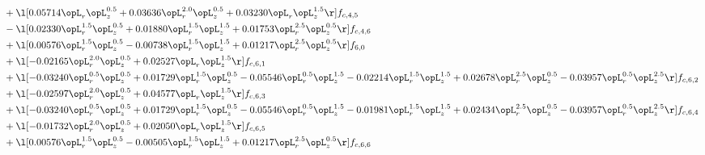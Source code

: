 \begin{alignat}{2}
& + \l[  0.05714 \opL_r \opL_z^{0.5} +  0.03636 \opL_r^{2.0} \opL_z^{0.5} +  0.03230 \opL_r \opL_z^{1.5}  \r] f_{c,4,5} \nonumber \\ 
& - \l[  0.02330 \opL_r^{1.5} \opL_z^{0.5} +  0.01880 \opL_r^{1.5} \opL_z^{1.5} +  0.01753 \opL_r^{2.5} \opL_z^{0.5}  \r] f_{c,4,6} \nonumber \\ 
& + \l[  0.00576 \opL_r^{1.5} \opL_z^{0.5}   -0.00738 \opL_r^{1.5} \opL_z^{1.5} +  0.01217 \opL_r^{2.5} \opL_z^{0.5}  \r] f_{6,0} \nonumber \\ 
& + \l[  -0.02165 \opL_r^{2.0} \opL_z^{0.5} +  0.02527 \opL_r \opL_z^{1.5}  \r] f_{c,6,1} \nonumber \\ 
& + \l[  -0.03240 \opL_r^{0.5} \opL_z^{0.5} +  0.01729 \opL_r^{1.5} \opL_z^{0.5}   -0.05546 \opL_r^{0.5} \opL_z^{1.5}   -0.02214 \opL_r^{1.5} \opL_z^{1.5} +  0.02678 \opL_r^{2.5} \opL_z^{0.5}   -0.03957 \opL_r^{0.5} \opL_z^{2.5}  \r] f_{c,6,2} \nonumber \\ 
& + \l[  -0.02597 \opL_r^{2.0} \opL_z^{0.5} +  0.04577 \opL_r \opL_z^{1.5}  \r] f_{c,6,3} \nonumber \\ 
& + \l[  -0.03240 \opL_r^{0.5} \opL_z^{0.5} +  0.01729 \opL_r^{1.5} \opL_z^{0.5}   -0.05546 \opL_r^{0.5} \opL_z^{1.5}   -0.01981 \opL_r^{1.5} \opL_z^{1.5} +  0.02434 \opL_r^{2.5} \opL_z^{0.5}   -0.03957 \opL_r^{0.5} \opL_z^{2.5}  \r] f_{c,6,4} \nonumber \\ 
& + \l[  -0.01732 \opL_r^{2.0} \opL_z^{0.5} +  0.02050 \opL_r \opL_z^{1.5}  \r] f_{c,6,5} \nonumber \\ 
& + \l[  0.00576 \opL_r^{1.5} \opL_z^{0.5}   -0.00505 \opL_r^{1.5} \opL_z^{1.5} +  0.01217 \opL_r^{2.5} \opL_z^{0.5}  \r] f_{c,6,6} \nonumber \\ 
\end{alignat} 


